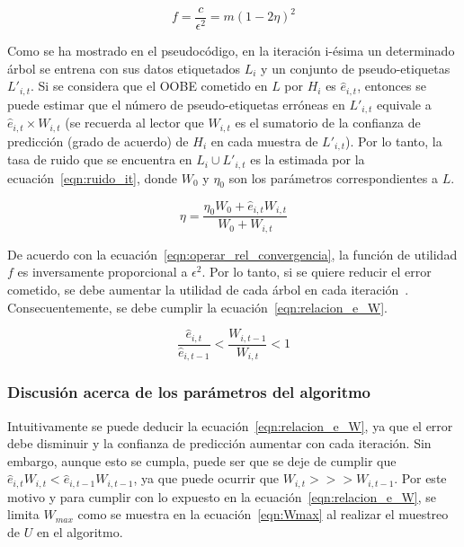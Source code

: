\begin{equation}\label{eqn:operar_rel_convergencia} f = \frac{c}{\epsilon^{2}} = m(1-2\eta)^{2} \end{equation} 

Como se ha mostrado en el pseudocódigo, en la iteración i-ésima un determinado árbol se entrena con sus datos etiquetados $L_{i}$ y un conjunto de pseudo-etiquetas $L'_{i,t}$. Si se considera que el OOBE cometido en $L$ por $H_{i}$ es $\hat{e}_{i,t}$, entonces se puede estimar que el número de pseudo-etiquetas erróneas en $L'_{i,t}$ equivale a $\hat{e}_{i,t} \times W_{i,t}$ (se recuerda al lector que $W_{i,t}$ es el sumatorio de la confianza de predicción (grado de acuerdo) de $H_{i}$ en cada muestra de $L'_{i,t}$). Por lo tanto, la tasa de ruido que se encuentra en $L_{i} \cup L'_{i,t}$ es la estimada por la ecuación~\ref{eqn:ruido_it}, donde $W_0$ y $\eta_0$ son los parámetros correspondientes a $L$. 

\begin{equation}\label{eqn:ruido_it} \eta = \frac{\eta_{0}W_{0} + \hat{e}_{i,t}W_{i,t}}{W_{0} + W_{i,t}} \end{equation} 

De acuerdo con la ecuación~\ref{eqn:operar_rel_convergencia}, la función de utilidad $f$ es inversamente proporcional a $\epsilon^2$. Por lo tanto, si se quiere reducir el error cometido, se debe aumentar la utilidad de cada árbol en cada iteración~\cite{zhou2021SemisupervisedRecommendationAttack}. Consecuentemente, se debe cumplir la ecuación~\ref{eqn:relacion_e_W}. 

\begin{equation}\label{eqn:relacion_e_W} \frac{\hat{e}_{i,t}}{\widehat{e}_{i, t-1}} < \frac{W_{i,t-1}}{W_{i,t}} < 1 \end{equation} 


\subsubsection{Discusión acerca de los parámetros del algoritmo}

Intuitivamente se puede deducir la ecuación~\ref{eqn:relacion_e_W}, ya que el error debe disminuir y la confianza de predicción aumentar con cada iteración. Sin embargo, aunque esto se cumpla, puede ser que se deje de cumplir que $\hat{e}_{i,t}W_{i,t} < \hat{e}_{i,t-1}W_{i,t-1}$, ya que puede ocurrir que $ W_{i,t} >>> W_{i,t-1}$. Por este motivo y para cumplir con lo expuesto en la ecuación~\ref{eqn:relacion_e_W}, se limita $W_{max}$ como se muestra en la ecuación~\ref{eqn:Wmax} al realizar el muestreo de $U$ en el algoritmo.

